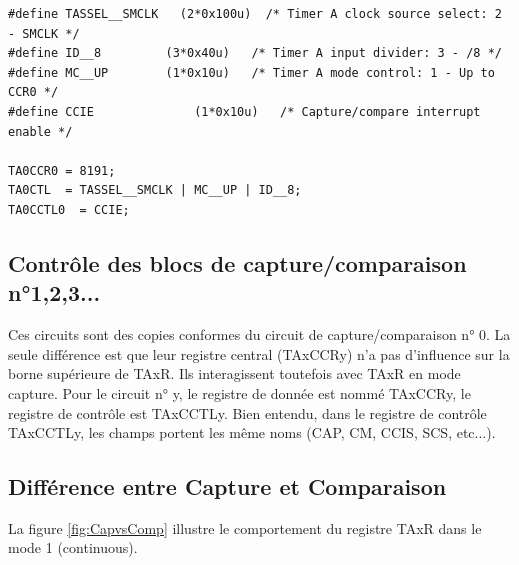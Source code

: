\lstset{style=customc}
\begin{lstlisting}
#define TASSEL__SMCLK	(2*0x100u)  /* Timer A clock source select: 2 - SMCLK */
#define ID__8         (3*0x40u)   /* Timer A input divider: 3 - /8 */
#define MC__UP        (1*0x10u)   /* Timer A mode control: 1 - Up to CCR0 */
#define CCIE		      (1*0x10u)   /* Capture/compare interrupt enable */

TA0CCR0 = 8191;
TA0CTL  = TASSEL__SMCLK | MC__UP | ID__8;
TA0CCTL0  = CCIE;
\end{lstlisting}

\subsection{Contrôle des blocs de capture/comparaison n°1,2,3...}
Ces circuits sont des copies conformes du circuit de capture/comparaison n° 0. La seule différence est que leur registre central (TAxCCRy) n'a pas d'influence sur la borne supérieure de TAxR. Ils interagissent toutefois avec TAxR en mode capture.
Pour le circuit n° y, le registre de donnée est nommé TAxCCRy, le registre de contrôle est TAxCCTLy.
Bien entendu, dans le registre de contrôle TAxCCTLy, les champs portent les même noms (CAP, CM, CCIS, SCS, etc...).

\subsection{Différence entre Capture et Comparaison}
La figure \ref{fig:CapvsComp} illustre le comportement du registre TAxR dans le mode 1 (continuous).


